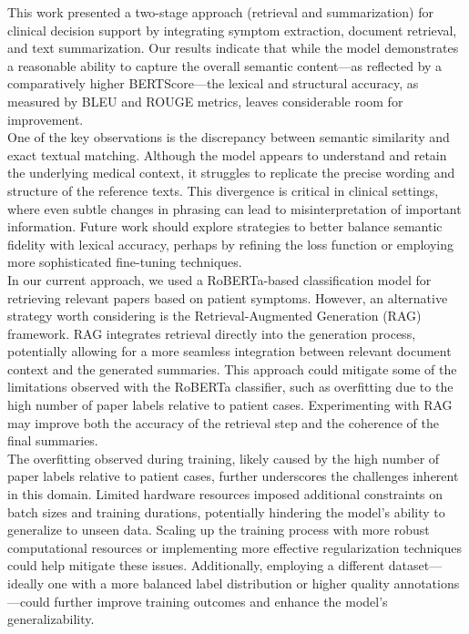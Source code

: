 This work presented a two-stage approach (retrieval and summarization) for clinical decision support by integrating symptom extraction, document retrieval, and text summarization. Our results indicate that while the model demonstrates a reasonable ability to capture the overall semantic content—as reflected by a comparatively higher BERTScore—the lexical and structural accuracy, as measured by BLEU and ROUGE metrics, leaves considerable room for improvement.\\
One of the key observations is the discrepancy between semantic similarity and exact textual matching. Although the model appears to understand and retain the underlying medical context, it struggles to replicate the precise wording and structure of the reference texts. This divergence is critical in clinical settings, where even subtle changes in phrasing can lead to misinterpretation of important information. Future work should explore strategies to better balance semantic fidelity with lexical accuracy, perhaps by refining the loss function or employing more sophisticated fine-tuning techniques.\\
In our current approach, we used a RoBERTa-based classification model for retrieving relevant papers based on patient symptoms. However, an alternative strategy worth considering is the Retrieval-Augmented Generation (RAG) framework. RAG integrates retrieval directly into the generation process, potentially allowing for a more seamless integration between relevant document context and the generated summaries. This approach could mitigate some of the limitations observed with the RoBERTa classifier, such as overfitting due to the high number of paper labels relative to patient cases. Experimenting with RAG may improve both the accuracy of the retrieval step and the coherence of the final summaries.\\
The overfitting observed during training, likely caused by the high number of paper labels relative to patient cases, further underscores the challenges inherent in this domain. Limited hardware resources imposed additional constraints on batch sizes and training durations, potentially hindering the model’s ability to generalize to unseen data. Scaling up the training process with more robust computational resources or implementing more effective regularization techniques could help mitigate these issues. Additionally, employing a different dataset—ideally one with a more balanced label distribution or higher quality annotations—could further improve training outcomes and enhance the model’s generalizability.\\
